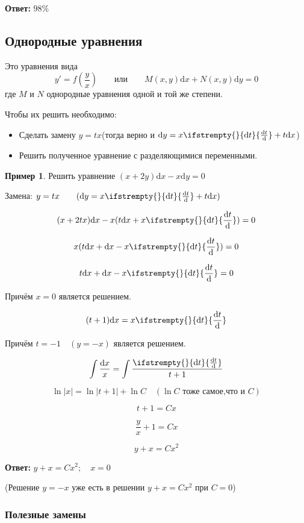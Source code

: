 \documentclass[a4paper, 14pt]{article}
\newcommand{\dx}{\mathrm{d}x}
\newcommand{\dy}{\mathrm{d}y}
\newcommand{\dv}[2]{%
  \ifstrempty{#2}%
    {\mathrm{d}#1}%
    {\frac{\mathrm{d}#1}{\mathrm{d}#2}}%
}
\theoremstyle{definition}
\newtheorem*{example}{Пример}
\newenvironment{answer}
  {\par\noindent\textbf{Ответ:}}
  {\par}
\begin{document}
\begin{answer}
    $98\%$
\end{answer}

\newpage
\subsection{Однородные уравнения}

Это уравнения вида
\[y' = f\left(\frac{y}{x}\right) \qquad \text{или} \qquad M(x, y)\dx + N(x, y)\dy = 0\]
где $M$ и $N$ однородные уравнения одной и той же степени.

Чтобы их решить необходимо:
\begin{itemize}
\item \textbf{}Сделать замену $y=tx$(тогда верно и $\dy = x\dv{t}{} + t\dx$)
\item \textbf{}Решить полученное уравнение с разделяющимися переменными.
\end{itemize}
\begin{example}
    Решить уравнение $(x+2y)\dx - x\dy=0$
    \smallskip
    
    Замена: $y = tx \qquad (\dy = x\dv{t}{} + t\dx)$

    \[(x+2tx)\dx - x(t\dx+x\dv{t}{})= 0\]

    \[x(t\dx+\dx-x\dv{t}{})=0\]

    \[t\dx+\dx-x\dv{t}{} = 0\]

    Причём $x = 0$ является решением.

    \[(t+1)\dx=x\dv{t}{}\]

    Причём $t = -1 \quad (y=-x)$ является решением.

    \[\int\frac{\dx}{x} = \int\frac{\dv{t}{}}{t+1}\]

    \[\ln{|x|} = \ln{|t+1| + \ln{C} \quad (\ln{C} \text{ тоже самое,что и } C)}\]

    \[t+1 = Cx\]

    \[\frac{y}{x} + 1 = Cx\]

    \[y + x = Cx^2\]
\end{example}
\begin{answer}
    $y + x = Cx^2; \quad x = 0$ 
\end{answer}
(Решение $y = -x$ уже есть в решении $y + x = Cx^2$ при $C = 0$)
\subsubsection{Полезные замены}
\end{document}
